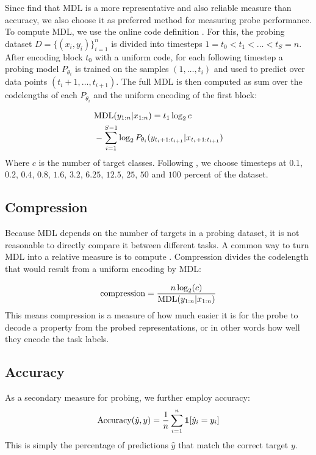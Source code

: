 Since \cite{voita-titov-2020-information} find that MDL is a more representative and also reliable measure than accuracy, we also choose it as preferred method for measuring probe performance. To compute MDL, we use the online code definition \cite{Rissanen1984UniversalCI}.
For this, the probing dataset $D=\{(x_i, y_i)\}_{i=1}^n$ is divided into timesteps $1=t_0 < t_1 < \ldots < t_S = n$. After encoding block $t_0$ with a uniform code, for each following timestep a probing model $P_{\theta_i}$ is trained on the samples $(1, \ldots, t_i)$ and used to predict over data points $(t_i + 1,\ldots, t_{i + 1})$. The full MDL is then computed as sum over the codelengths of each $P_{\theta_i}$ and the uniform encoding of the first block:

\begin{equation}
    \begin{aligned}
         & \text{MDL}(y_{1:n} | x_{1:n}) = t_1 \log_2 c                                        \\
         & - \sum_{i=1}^{S-1} \log_2 P_{\theta_i}(y_{t_i + 1:t_{i+1}} | x_{t_i + 1:t_{i+1}})
    \end{aligned}
\end{equation}
Where $c$ is the number of target classes.
Following \cite{voita-titov-2020-information}, we choose timesteps at $0.1$, $0.2$, $0.4$, $0.8$, $1.6$, $3.2$, $6.25$, $12.5$, $25$, $50$ and $100$ percent of the dataset.

\subsection{Compression}
Because MDL depends on the number of targets in a probing dataset, it is not reasonable to directly compare it between different tasks. A common way to turn MDL into a relative measure is to compute . Compression divides the codelength that would result from a uniform encoding by MDL:

\begin{equation}
    \text{compression} = \frac{n \log_2(c)}{\text{MDL}(y_{1:n} | x_{1:n})}
\end{equation}
This means compression is a measure of how much easier it is for the probe to decode a property from the probed representations, or in other words how well they encode the task labels.

\subsection{Accuracy}
As a secondary measure for probing, we further employ accuracy:
\begin{equation}
    \text{Accuracy}(\hat{y}, y) = \frac{1}{n} \sum_{i=1}^n \mathbf{1} [\hat{y}_i = y_i]
\end{equation}
This is simply the percentage of predictions $\hat{y}$ that match the correct target $y$.

